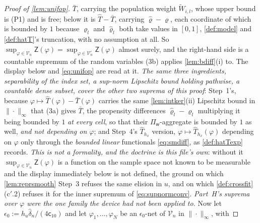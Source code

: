 \begin{proof}[Proof of \cref{lem:unifop}]
$\bar T$, carrying the population weight $\widetilde W_{i,l}$, whose upper bound is \textup{(P1)} and is free;
below it is $\hat T-\bar T$, carrying $\hat\varrho-\varrho$, each coordinate of which is bounded by $1$
because $\varrho_l$ and
$\hat\varrho_l$ both take values in $[0,1]$, \cref{def:model} and \cref{def:hatT}'s truncation, with
no assumption at all.
So $\sup_{\varphi\in\mathcal V_n}\mathsf Z(\varphi)=\sup_{\varphi\in\mathcal V_n^{\circ}}\mathsf Z(\varphi)$
almost surely, and the
right-hand side is a countable supremum of the random variables (3b) applies \cref{lem:bdiff}(i) to. The
display below and \eqref{eq:unifop} are read at it. \emph{The same three ingredients, separability of the
index set, a sup-norm Lipschitz bound holding pathwise, a countable dense subset, cover the other two
suprema of this proof}: Step~1's, because $\varphi\mapsto\hat T(\varphi)-\bar T(\varphi)$ carries the same
\cref{lem:intker}(ii) Lipschitz bound in $\|\cdot\|_\infty$ that (3a) gives $\bar T$, the propensity
differences $\hat\varrho_l-\varrho_l$ multiplying it being bounded by $1$ \emph{at every cell}, so that
their $\Pi_{\mathsf w}$-aggregate is bounded by $1$ as well, \emph{and not depending on
$\varphi$}; and Step~4's $\hat T_{h_x}$ version,
$\varphi\mapsto\hat T_{h_x}(\varphi)$ depending on $\varphi$ only through the \emph{bounded linear}
functionals \eqref{eq:smdiff}, as \cref{def:hatTexp} records. \emph{This is not a formality, and the doctrine
is this file's own}: without it $\sup_{\varphi\in\mathcal V_n}\mathsf Z(\varphi)$ is a function on the
sample space not known to be
measurable and the display immediately below is not defined, the ground on which \cref{lem:reprsmooth}
Step~3 refuses the same elision in $u$, and on which \cref{def:crossfit}\textup{(c$'$.2)} refuses it for the
inner supremum of \eqref{eq:supnormconv}. \emph{Part~H's suprema over $\varphi$ were the one family the device
had not been applied to.}
Now let
$\epsilon_0:=h_u\hat\delta_n/(4\mathsf c_{10})$ and let $\varphi_1,\dots,\varphi_N$ be an
$\epsilon_0$-net of $\mathcal V_n$ in $\|\cdot\|_\infty$, with

\end{proof}
